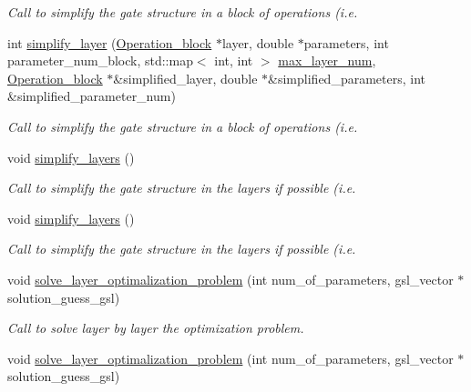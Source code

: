 \begin{DoxyCompactItemize}
\begin{DoxyCompactList}\small\item\em Call to simplify the gate structure in a block of operations (i.\+e. \end{DoxyCompactList}\item 
int \hyperlink{class_n___qubit___decomposition_a13453d7704869cfc8536767c2db4518d}{simplify\+\_\+layer} (\hyperlink{class_operation__block}{Operation\+\_\+block} $\ast$layer, double $\ast$parameters, int parameter\+\_\+num\+\_\+block, std\+::map$<$ int, int $>$ \hyperlink{class_decomposition___base_a861d7b10226fc13f05c131e18c8be908}{max\+\_\+layer\+\_\+num}, \hyperlink{class_operation__block}{Operation\+\_\+block} $\ast$\&simplified\+\_\+layer, double $\ast$\&simplified\+\_\+parameters, int \&simplified\+\_\+parameter\+\_\+num)
\begin{DoxyCompactList}\small\item\em Call to simplify the gate structure in a block of operations (i.\+e. \end{DoxyCompactList}\item 
void \hyperlink{class_n___qubit___decomposition_af768a6b3f20e1fd9909271941cf34b6f}{simplify\+\_\+layers} ()
\begin{DoxyCompactList}\small\item\em Call to simplify the gate structure in the layers if possible (i.\+e. \end{DoxyCompactList}\item 
void \hyperlink{class_n___qubit___decomposition_af768a6b3f20e1fd9909271941cf34b6f}{simplify\+\_\+layers} ()
\begin{DoxyCompactList}\small\item\em Call to simplify the gate structure in the layers if possible (i.\+e. \end{DoxyCompactList}\item 
void \hyperlink{class_n___qubit___decomposition_a868492cd4a56a047f740bb69a132c8dc}{solve\+\_\+layer\+\_\+optimalization\+\_\+problem} (int num\+\_\+of\+\_\+parameters, gsl\+\_\+vector $\ast$solution\+\_\+guess\+\_\+gsl)
\begin{DoxyCompactList}\small\item\em Call to solve layer by layer the optimization problem. \end{DoxyCompactList}\item 
void \hyperlink{class_n___qubit___decomposition_a868492cd4a56a047f740bb69a132c8dc}{solve\+\_\+layer\+\_\+optimalization\+\_\+problem} (int num\+\_\+of\+\_\+parameters, gsl\+\_\+vector $\ast$solution\+\_\+guess\+\_\+gsl)

\end{DoxyCompactItemize}
